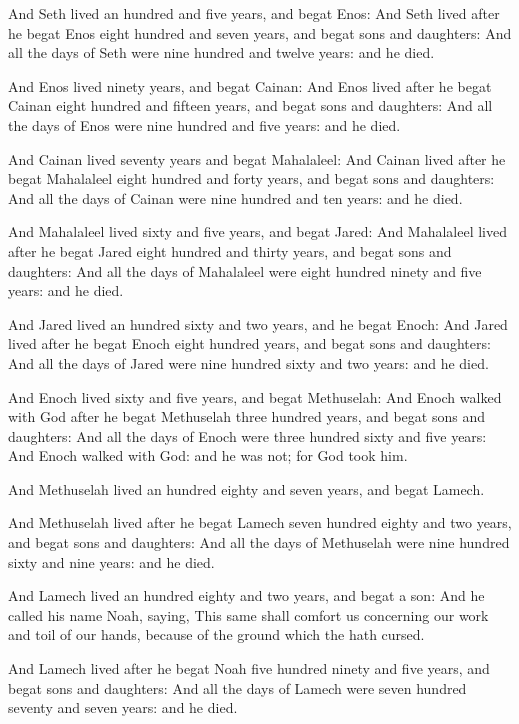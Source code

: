 \verse And Seth lived an hundred and five years, and begat Enos: \verse And Seth lived after he begat Enos eight hundred and seven years, and begat sons and daughters: \verse And all the days of Seth were nine hundred and twelve years: and he died.

\verse And Enos lived ninety years, and begat Cainan: \verse And Enos lived after he begat Cainan eight hundred and fifteen years, and begat sons and daughters: \verse And all the days of Enos were nine hundred and five years: and he died.

\verse And Cainan lived seventy years and begat Mahalaleel: \verse And Cainan lived after he begat Mahalaleel eight hundred and forty years, and begat sons and daughters: \verse And all the days of Cainan were nine hundred and ten years: and he died.

\verse And Mahalaleel lived sixty and five years, and begat Jared: \verse And Mahalaleel lived after he begat Jared eight hundred and thirty years, and begat sons and daughters: \verse And all the days of Mahalaleel were eight hundred ninety and five years: and he died.

\verse And Jared lived an hundred sixty and two years, and he begat Enoch: \verse And Jared lived after he begat Enoch eight hundred years, and begat sons and daughters: \verse And all the days of Jared were nine hundred sixty and two years: and he died.

\verse And Enoch lived sixty and five years, and begat Methuselah: \verse And Enoch walked with God after he begat Methuselah three hundred years, and begat sons and daughters: \verse And all the days of Enoch were three hundred sixty and five years: \verse And Enoch walked with God: and he was not; for God took him.

\verse And Methuselah lived an hundred eighty and seven years, and begat Lamech.

\verse And Methuselah lived after he begat Lamech seven hundred eighty and two years, and begat sons and daughters: \verse And all the days of Methuselah were nine hundred sixty and nine years: and he died.

\verse And Lamech lived an hundred eighty and two years, and begat a son: \verse And he called his name Noah, saying, This same shall comfort us concerning our work and toil of our hands, because of the ground which the \LORD hath cursed.

\verse And Lamech lived after he begat Noah five hundred ninety and five years, and begat sons and daughters: \verse And all the days of Lamech were seven hundred seventy and seven years: and he died.

